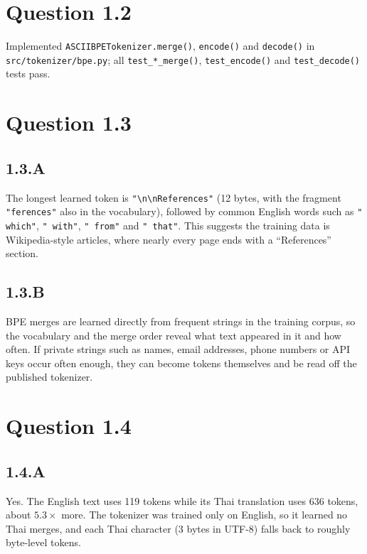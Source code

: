 \documentclass{article}
\begin{document}
\section*{Question 1.2}
Implemented \texttt{ASCIIBPETokenizer.merge()}, \texttt{encode()} and \texttt{decode()} in \texttt{src/tokenizer/bpe.py}; all \texttt{test\_*\_merge()}, \texttt{test\_encode()} and \texttt{test\_decode()} tests pass.

\section*{Question 1.3}

\subsection*{1.3.A}
The longest learned token is \texttt{"\textbackslash n\textbackslash nReferences"} (12 bytes, with the fragment \texttt{"ferences"} also in the vocabulary), followed by common English words such as \texttt{" which"}, \texttt{" with"}, \texttt{" from"} and \texttt{" that"}. This suggests the training data is Wikipedia-style articles, where nearly every page ends with a ``References'' section.

\subsection*{1.3.B}
BPE merges are learned directly from frequent strings in the training corpus, so the vocabulary and the merge order reveal what text appeared in it and how often. If private strings such as names, email addresses, phone numbers or API keys occur often enough, they can become tokens themselves and be read off the published tokenizer.

\section*{Question 1.4}

\subsection*{1.4.A}
Yes. The English text uses 119 tokens while its Thai translation uses 636 tokens, about $5.3\times$ more. The tokenizer was trained only on English, so it learned no Thai merges, and each Thai character (3 bytes in UTF-8) falls back to roughly byte-level tokens.
\end{document}
